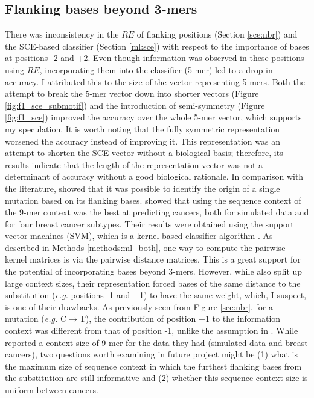 \subsection{Flanking bases beyond 3-mers}
There was inconsistency in the $RE$ of flanking positions (Section \ref{sce:nbr}) and the SCE-based classifier (Section \ref{ml:sce}) with respect to the importance of bases at positions -2 and +2. Even though information was observed in these positions using $RE$, incorporating them into the classifier (5-mer) led to a drop in accuracy. I attributed this to the size of the vector representing 5-mers. Both the attempt to break the 5-mer vector down into shorter vectors (Figure \ref{fig:f1_sce_submotif}) and the introduction of semi-symmetry (Figure \ref{fig:f1_sce}) improved the accuracy over the whole 5-mer vector, which supports my speculation. It is worth noting that the fully symmetric representation worsened the accuracy instead of improving it. This representation was an attempt to shorten the SCE vector without a biological basis; therefore, its results indicate that the length of the representation vector was not a determinant of accuracy without a good biological rationale. In comparison with the literature, \citet{Zhu2020} showed that it was possible to identify the origin of a single mutation based on its flanking bases. \citep{Zhang2020} showed that using the sequence context of the 9-mer context was the best at predicting cancers, both for simulated data and for four breast cancer subtypes. Their results were obtained using the support vector machines (SVM), which is a kernel based classifier algorithm \citep{Susmita2019AAlgorithms}. As described in Methods \ref{methods:ml_both}, one way to compute the pairwise kernel matrices is via the pairwise distance matrices.  This is a great support for the potential of incorporating bases beyond 3-mers. However, while \citet{Zhang2020} also split up large context sizes, their representation forced bases of the same distance to the substitution (\textit{e.g.} positions -1 and +1) to have the same weight, which, I suspect, is one of their drawbacks. As previously seen from Figure \ref{sce:nbr}, for a mutation (\textit{e.g.} C$\rightarrow$T), the contribution of position +1 to the information context was different from that of position -1, unlike the assumption in \citet{Zhang2020}. While \citet{Zhang2020} reported a context size of 9-mer for the data they had (simulated data and breast cancers), two questions worth examining in future project might be (1) what is the maximum size of sequence context in which the furthest flanking bases from the substitution are still informative and (2) whether this sequence context size is uniform between cancers. 

